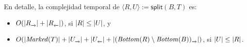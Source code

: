 \begin{algorithm}[tb]
\begin{algorithmic}[1]
	\end{algorithmic}
	\end{algorithm}


En detalle, la complejidad temporal de $\langle R, U \rangle := \mathsf{split}(B, T)$ es:
\begin{itemize}
\item $\bigo{\size{R_{\pijl{}}} + \size{R_{\lijp{}}}}$, si $\left\lvert R \right\rvert \leq \left\lvert U \right\rvert$,
y
\item $\bigo{\size{\Marked(T)} + \size{U_{\pijl{}}} + \size{U_{\lijp{}}} + \size{(\Bottom(R) \setminus \Bottom(B))_{\pijl{}}}}$, si $\left\lvert U \right\rvert \leq \left\lvert R \right\rvert$.
\end{itemize}

